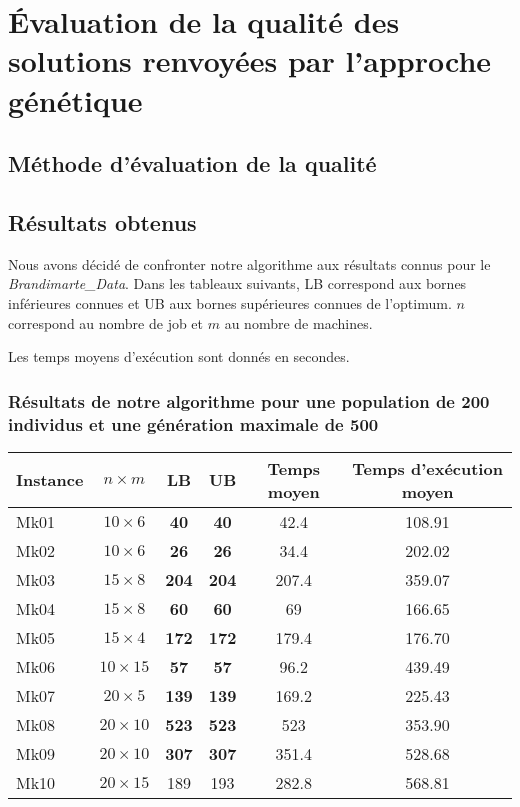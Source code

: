 \section{Évaluation de la qualité des solutions renvoyées par l'approche génétique}

\subsection{Méthode d'évaluation de la qualité}



\subsection{Résultats obtenus}

Nous avons décidé de confronter notre algorithme aux résultats connus pour le \textit{Brandimarte_Data}. Dans les tableaux suivants, LB correspond aux bornes inférieures connues et UB aux bornes supérieures connues de l'optimum. $n$ correspond au nombre de job et $m$ au nombre de machines.

Les temps moyens d'exécution sont donnés en secondes.

\subsubsection{Résultats de notre algorithme pour une population de 200 individus et une génération maximale de 500}

\begin{table}[!h]
    \renewcommand{\arraystretch}{1.5}
    \centering
    \begin{tabular}{p{} c c c c c}
        Instance & $n \times m$ & LB & UB & Temps moyen & Temps d'exécution moyen \\
         \hline
        Mk01 & $10 \times 6$ & \textbf{40} & \textbf{40} & 42.4 & 108.91 \\
         \hline
        Mk02 & $10 \times 6$ & \textbf{26} & \textbf{26} & 34.4 & 202.02 \\
         \hline
        Mk03 & $15 \times 8$ & \textbf{204} & \textbf{204} & 207.4 & 359.07 \\
         \hline
        Mk04 & $15 \times 8$ & \textbf{60} & \textbf{60} & 69 & 166.65 \\
         \hline
        Mk05 & $15 \times 4$ & \textbf{172} & \textbf{172} & 179.4 & 176.70 \\
         \hline
        Mk06 & $10 \times 15$ & \textbf{57} & \textbf{57} & 96.2 & 439.49 \\
         \hline
        Mk07 & $20 \times 5$ & \textbf{139} & \textbf{139} & 169.2 & 225.43 \\
         \hline
        Mk08 & $20 \times 10$ & \textbf{523} & \textbf{523} & 523 & 353.90 \\
         \hline
        Mk09 & $20 \times 10$ & \textbf{307} & \textbf{307} & 351.4 & 528.68 \\
         \hline
        Mk10 & $20 \times 15$ & 189 & 193 & 282.8 & 568.81 \\
         \hline 
    \end{tabular}
\end{table}

